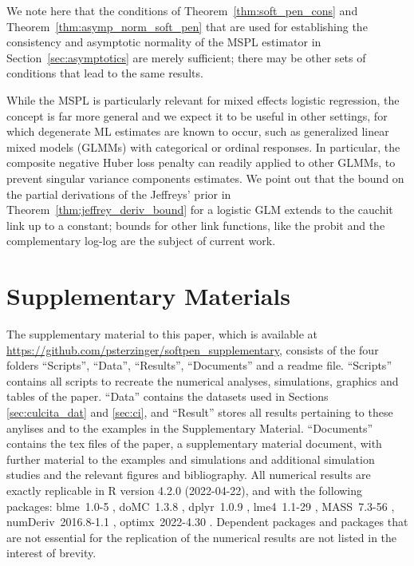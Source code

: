 \documentclass[11pt, a4paper]{article}
\theoremstyle{example} \newtheorem{example}{Example}[section]
\theoremstyle{theorem} \newtheorem{theorem}{Theorem}[section]
\begin{document}
We note here that the conditions of Theorem~\ref{thm:soft_pen_cons}
and Theorem~\ref{thm:asymp_norm_soft_pen} that are used for
establishing the consistency and asymptotic normality of the MSPL
estimator in Section~\ref{sec:asymptotics} are merely sufficient;
there may be other sets of conditions that lead to the same results.

While the MSPL is particularly relevant for mixed effects logistic
regression, the concept is far more general and we expect it to be
useful in other settings, for which degenerate ML estimates are known
to occur, such as generalized linear mixed models (GLMMs) with
categorical or ordinal responses. In particular, the composite
negative Huber loss penalty can readily applied to other GLMMs, to
prevent singular variance components estimates. We point out that the
bound on the partial derivations of the Jeffreys' prior in
Theorem~\ref{thm:jeffrey_deriv_bound} for a logistic GLM extends to
the cauchit link up to a constant; bounds for other link functions,
like the probit and the complementary log-log are the subject of
current work.

\section{Supplementary Materials}
The supplementary material to this paper, which is available at \url{https://github.com/psterzinger/softpen_supplementary}, consists of the four folders ``Scripts'', ``Data'', ``Results'', ``Documents'' and a readme file. ``Scripts'' contains all scripts to recreate the numerical analyses, simulations, graphics and tables of the paper. ``Data'' contains the datasets used in Sections \ref{sec:culcita_dat} and \ref{sec:ci}, and ``Result'' stores all results pertaining to these anylises and to the examples in the Supplementary Material. ``Documents'' contains the tex files of the paper, a supplementary material document, with further material to the examples and simulations and
additional simulation studies and the relevant figures and bibliography. All numerical results are exactly replicable in R version 4.2.0 (2022-04-22), and with the following packages: blme~1.0-5 \citep{chung+etal:2013}, doMC~1.3.8 \citep{doMC}, dplyr~1.0.9 \citep{dplyr}, lme4~1.1-29 \citep{bates+etal:2015}, MASS~7.3-56 \citep{MASS}, numDeriv~2016.8-1.1 \citep{gilbert+varadhan:2019}, optimx~2022-4.30 \citep{nash:2014}. Dependent packages and packages that are not essential for the replication of the numerical results are not listed in the interest of brevity.
\appendix
\end{document}
